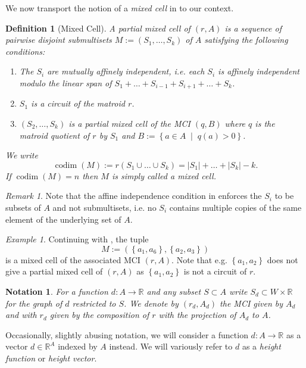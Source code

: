 \documentclass[a4paper]{article}
\newtheorem{definition}{Definition}
\newtheorem{notation}{Notation}
\theoremstyle{remark}
\newtheorem{remark}{Remark}
\newtheorem{example}{Example}
\newcommand{\set}[1]{\left\{#1\right\}}
\newcommand{\setdes}[2]{\left\{#1\;\middle|\;#2\right\}}
\def\RR{\mathbb{R}}
\DeclareMathOperator{\codim}{codim}
\begin{document}
We now transport the notion of a {\em mixed cell} in \cite{huber1995}
to our context. 

\begin{definition}[Mixed Cell]
  \label{def:pmixedcell}
  A {\em partial mixed cell} of $(r,A)$ is a sequence of pairwise
  disjoint submultisets $M := (S_1,\hdots,S_k)$ of $A$ satisfying the
  following conditions:
  \begin{enumerate}
  \item The $S_i$ are mutually affinely independent, i.e. each $S_i$
    is affinely independent modulo the linear span of
    $S_1+ \hdots + S_{i-1} + S_{i+1}+\hdots + S_k$.
  \item $S_1$ is a circuit of the matroid $r$.
  \item $(S_2,\dots,S_k)$ is a partial mixed cell of the MCI $(q,B)$
    where $q$ is the matroid quotient of $r$ by $S_1$ and
    $B:=\setdes{a\in A}{q(a) > 0}$.
  \end{enumerate}
  We write
  \[\codim(M) := r(S_1\cup \hdots \cup S_k) = |S_1| + \hdots + |S_k| - k.\]
  If $\codim(M) = n$ then $M$ is simply called a mixed cell.
\end{definition}

\begin{remark}
  Note that the affine independence condition in 
  enforces the $S_i$ to be subsets of $A$ and not submultisets,
  i.e. no $S_i$ contains multiple copies of the same element of the
  underlying set of $A$.
\end{remark}

\begin{example}
  Continuing with , the tuple
  \[M := (\set{a_1,a_6}, \set{a_2,a_3})\] is a mixed cell of the
  associated MCI $(r, A)$. Note that e.g. $\set{a_1,a_2}$ does not give
  a partial mixed cell of $(r, A)$ as $\set{a_1,a_2}$ is not a circuit of
  $r$.
\end{example}

\begin{notation}
  For a function $d:A\rightarrow \RR$ and any subset $S\subset A$ write
  $S_d\subset W\times \RR$ for the graph of $d$ restricted to $S$. We denote by
  $(r_d,A_d)$ the MCI given by $A_d$ and with $r_d$ given by the
  composition of $r$ with the projection of $A_d$ to $A$.
\end{notation}

Occasionally, slightly abusing notation, we will consider a function
$d : A \rightarrow \RR$ as a vector $d\in \RR^A$ indexed by $A$ instead. We will
variously refer to $d$ as a \textit{height function} or \textit{height
  vector}.
\end{document}
